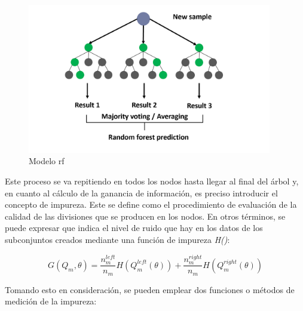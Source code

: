\vspace{3mm}

\begin{figure}[h!]
    \centering
    \includegraphics[width=0.95\textwidth]{img/teoria/rf.png}
    \caption{Modelo \acrshort{rf} \cite{rfmedium}}
    \label{fig:rf}
\end{figure}

\vspace{3mm}

Este proceso se va repitiendo en todos los nodos hasta llegar al final del árbol y, en cuanto al cálculo de la ganancia de información, es preciso introducir el concepto de impureza. Este se define como el procedimiento de evaluación de la calidad de las divisiones que se producen en los nodos. En otros términos, se puede expresar que indica el nivel de ruido que hay en los datos de los subconjuntos creados mediante una función de impureza \textit{H()}:

\vspace{3mm}

\[G(Q_m, \theta) = \frac{n_m^{left}}{n_m} H(Q_m^{left}(\theta)) + \frac{n_m^{right}}{n_m} H(Q_m^{right}(\theta))\]

\vspace{3mm}
\pagebreak

Tomando esto en consideración, se pueden emplear dos funciones o métodos de medición de la impureza:~\cite{rfmedium2} \cite{scikitrf}

